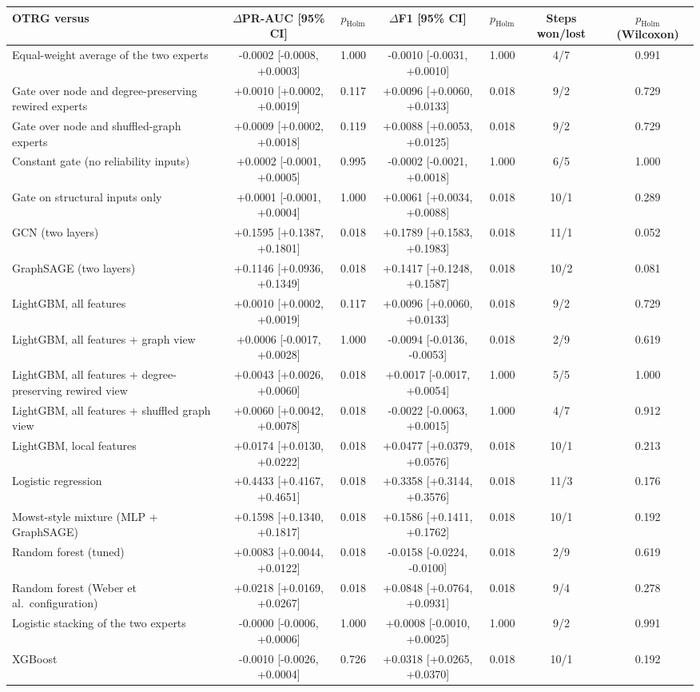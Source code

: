 \begin{tabular}{lcccccc}
\toprule
OTRG versus & $\Delta$PR-AUC [95\% CI] & $p_{\mathrm{Holm}}$ & $\Delta$F1 [95\% CI] & $p_{\mathrm{Holm}}$ & Steps won/lost & $p_{\mathrm{Holm}}$ (Wilcoxon) \\
\midrule
Equal-weight average of the two experts & -0.0002 [-0.0008, +0.0003] & 1.000 & -0.0010 [-0.0031, +0.0010] & 1.000 & 4/7 & 0.991 \\
Gate over node and degree-preserving rewired experts & +0.0010 [+0.0002, +0.0019] & 0.117 & +0.0096 [+0.0060, +0.0133] & 0.018 & 9/2 & 0.729 \\
Gate over node and shuffled-graph experts & +0.0009 [+0.0002, +0.0018] & 0.119 & +0.0088 [+0.0053, +0.0125] & 0.018 & 9/2 & 0.729 \\
Constant gate (no reliability inputs) & +0.0002 [-0.0001, +0.0005] & 0.995 & -0.0002 [-0.0021, +0.0018] & 1.000 & 6/5 & 1.000 \\
Gate on structural inputs only & +0.0001 [-0.0001, +0.0004] & 1.000 & +0.0061 [+0.0034, +0.0088] & 0.018 & 10/1 & 0.289 \\
GCN (two layers) & +0.1595 [+0.1387, +0.1801] & 0.018 & +0.1789 [+0.1583, +0.1983] & 0.018 & 11/1 & 0.052 \\
GraphSAGE (two layers) & +0.1146 [+0.0936, +0.1349] & 0.018 & +0.1417 [+0.1248, +0.1587] & 0.018 & 10/2 & 0.081 \\
LightGBM, all features & +0.0010 [+0.0002, +0.0019] & 0.117 & +0.0096 [+0.0060, +0.0133] & 0.018 & 9/2 & 0.729 \\
LightGBM, all features + graph view & +0.0006 [-0.0017, +0.0028] & 1.000 & -0.0094 [-0.0136, -0.0053] & 0.018 & 2/9 & 0.619 \\
LightGBM, all features + degree-preserving rewired view & +0.0043 [+0.0026, +0.0060] & 0.018 & +0.0017 [-0.0017, +0.0054] & 1.000 & 5/5 & 1.000 \\
LightGBM, all features + shuffled graph view & +0.0060 [+0.0042, +0.0078] & 0.018 & -0.0022 [-0.0063, +0.0015] & 1.000 & 4/7 & 0.912 \\
LightGBM, local features & +0.0174 [+0.0130, +0.0222] & 0.018 & +0.0477 [+0.0379, +0.0576] & 0.018 & 10/1 & 0.213 \\
Logistic regression & +0.4433 [+0.4167, +0.4651] & 0.018 & +0.3358 [+0.3144, +0.3576] & 0.018 & 11/3 & 0.176 \\
Mowst-style mixture (MLP + GraphSAGE) & +0.1598 [+0.1340, +0.1817] & 0.018 & +0.1586 [+0.1411, +0.1762] & 0.018 & 10/1 & 0.192 \\
Random forest (tuned) & +0.0083 [+0.0044, +0.0122] & 0.018 & -0.0158 [-0.0224, -0.0100] & 0.018 & 2/9 & 0.619 \\
Random forest (Weber et al.\ configuration) & +0.0218 [+0.0169, +0.0267] & 0.018 & +0.0848 [+0.0764, +0.0931] & 0.018 & 9/4 & 0.278 \\
Logistic stacking of the two experts & -0.0000 [-0.0006, +0.0006] & 1.000 & +0.0008 [-0.0010, +0.0025] & 1.000 & 9/2 & 0.991 \\
XGBoost & -0.0010 [-0.0026, +0.0004] & 0.726 & +0.0318 [+0.0265, +0.0370] & 0.018 & 10/1 & 0.192 \\
\bottomrule
\end{tabular}

